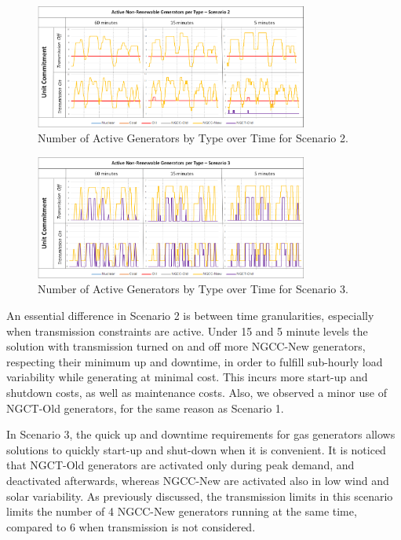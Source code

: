 \documentclass[12pt,LUDisStyle,twosided]{book}
\begin{document}
  \begin{figure}[H] 
  \centering
  
	  \includegraphics[width=0.8\textwidth,keepaspectratio]{activeGeneratorsS2.png}
  
  \caption{Number of Active Generators by Type over Time for Scenario 2.}
  \label{fig:activeGeneratorsS2}
  
\end{figure}


\begin{figure}[H] 
  \centering
  
	  \includegraphics[width=0.8\textwidth,keepaspectratio]{activeGeneratorsS3.png}
  
  \caption{Number of Active Generators by Type over Time for Scenario 3.}
  \label{fig:activeGeneratorsS3}
  
\end{figure}

An essential difference in Scenario 2 is between time granularities, especially when transmission constraints are active. Under 15 and 5 minute levels the solution with transmission turned on and off more NGCC-New generators, respecting their minimum up and downtime, in order to fulfill sub-hourly load variability while generating at minimal cost. This incurs more start-up and shutdown costs, as well as maintenance costs. Also, we observed a minor use of NGCT-Old generators, for the same reason as Scenario 1.

In Scenario 3, the quick up and downtime requirements for gas generators allows solutions to quickly start-up and shut-down when it is convenient. It is noticed that NGCT-Old generators are activated only during peak demand, and deactivated afterwards, whereas NGCC-New are activated also in low wind and solar variability. As previously discussed, the transmission limits in this scenario limits the number of 4 NGCC-New generators running at the same time, compared to 6 when transmission is not considered.
\end{document}
